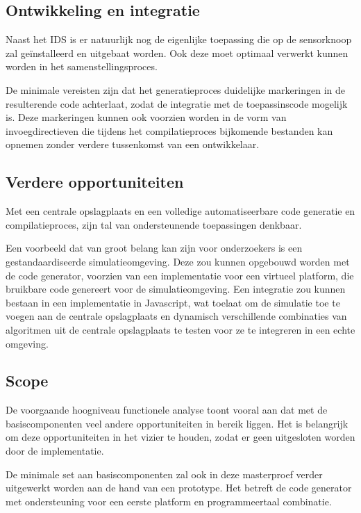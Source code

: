 \subsection{Ontwikkeling en integratie}
\label{subsection:arch-integration}

Naast het IDS is er natuurlijk nog de eigenlijke toepassing die op de
sensorknoop zal ge\"installeerd en uitgebaat worden. Ook deze moet optimaal
verwerkt kunnen worden in het samenstellingsproces.

De minimale vereisten zijn dat het generatieproces duidelijke markeringen in de
resulterende code achterlaat, zodat de integratie met de toepassinscode
mogelijk is. Deze markeringen kunnen ook voorzien worden in de vorm van
invoegdirectieven die tijdens het compilatieproces bijkomende bestanden kan
opnemen zonder verdere tussenkomst van een ontwikkelaar.

\subsection{Verdere opportuniteiten}
\label{subsection:arch-opportunities}

Met een centrale opslagplaats en een volledige automatiseerbare code generatie
en compilatieproces, zijn tal van ondersteunende toepassingen denkbaar.

Een voorbeeld dat van groot belang kan zijn voor onderzoekers is een
gestandaardiseerde simulatieomgeving. Deze zou kunnen opgebouwd worden met de
code generator, voorzien van een implementatie voor een virtueel platform, die
bruikbare code genereert voor de simulatieomgeving. Een integratie zou kunnen
bestaan in een implementatie in Javascript, wat toelaat om de simulatie toe te
voegen aan de centrale opslagplaats en dynamisch verschillende combinaties van
algoritmen uit de centrale opslagplaats te testen voor ze te integreren in een
echte omgeving.

\subsection{Scope}
\label{subsection:arch-scope}

De voorgaande hoogniveau functionele analyse toont vooral aan dat met de
basiscomponenten veel andere opportuniteiten in bereik liggen. Het is
belangrijk om deze opportuniteiten in het vizier te houden, zodat er geen
uitgesloten worden door de implementatie.

De minimale set aan basiscomponenten zal ook in deze masterproef verder uitgewerkt
worden aan de hand van een prototype. Het betreft de code generator met
ondersteuning voor een eerste platform en programmeertaal combinatie.

